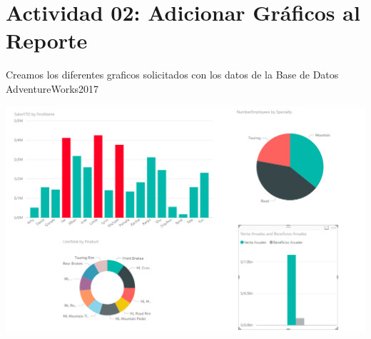 \section{Actividad 02: Adicionar Gráficos al Reporte} 

Creamos los diferentes graficos solicitados con los datos de la Base de Datos AdventureWorks2017
	\begin{center}
	\includegraphics[width=17cm]{./Imagenes/imagen5}
	\end{center}	